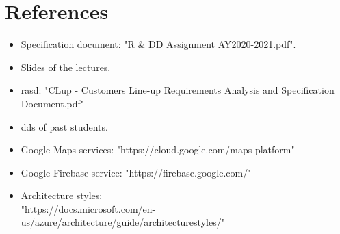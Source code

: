 \chapter{References}

\begin{itemize}
    \item Specification document: "R \& DD Assignment AY2020-2021.pdf".
    \item Slides of the lectures.
    \item \gls{rasd}: "CLup - Customers Line-up Requirements Analysis and Specification Document.pdf"
	\item \glspl{dd} of past students.
    \item Google Maps services: "https://cloud.google.com/maps-platform"
    \item Google Firebase service: "https://firebase.google.com/"
    \item Architecture styles:\\ "https://docs.microsoft.com/en-us/azure/architecture/guide/architecturestyles/"
\end{itemize}
